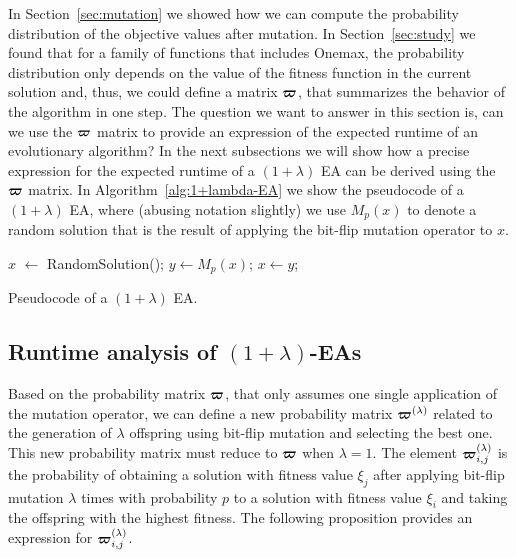 \documentclass{article}
\def\vec#1{\mathchoice{\mbox{\boldmath$\displaystyle#1$}}
  {\mbox{\boldmath$\textstyle#1$}}
  {\mbox{\boldmath$\scriptstyle#1$}}
  {\mbox{\boldmath$\scriptscriptstyle#1$}}}
\begin{document}
In Section~\ref{sec:mutation} we showed how we can compute the probability distribution of the objective values after mutation. In Section~\ref{sec:study} we found that for a family of functions that includes Onemax, the probability distribution only depends on the value of the fitness function in the current solution and, thus, we could define a matrix $\vec{\varpi}$, that summarizes the behavior of the algorithm in one step. The question we want to answer in this section is, can we use the $\vec{\varpi}$ matrix to provide an expression of the expected runtime of an evolutionary algorithm? In the next subsections we will show how a precise expression for the expected runtime of a $(1+\lambda)$ EA can be derived using the $\vec{\varpi}$ matrix. In Algorithm~\ref{alg:1+lambda-EA} we show the pseudocode of a $(1+\lambda)$ EA, where (abusing notation slightly) we use $M_p(x)$ to denote a random solution that is the result of applying the bit-flip mutation operator to $x$.

\begin{algorithm}[!ht]
\begin{algorithmic}
\STATE $x$ $\leftarrow$ RandomSolution();
\STATE $y \leftarrow M_p(x)$;
\STATE $x \leftarrow y$;
\ENDIF 
\ENDFOR
\ENDWHILE
\end{algorithmic}
\caption{Pseudocode of a $(1+\lambda)$ EA.}
\label{alg:1+lambda-EA}
\end{algorithm}



\subsection{Runtime analysis of $(1+\lambda)$-EAs}


Based on the probability matrix $\vec{\varpi}$, that only assumes one single application of the mutation operator, we can define a new probability matrix $\vec{\varpi}^{(\lambda)}$ related to the generation of $\lambda$ offspring using bit-flip mutation and selecting the best one. This new probability matrix must reduce to $\vec{\varpi}$ when $\lambda=1$. The element $\vec{\varpi}^{(\lambda)}_{i,j}$ is the probability of obtaining a solution with fitness value $\xi_j$ after applying bit-flip mutation $\lambda$ times with probability $p$ to a solution with fitness value $\xi_i$ and taking the offspring with the highest fitness. The following proposition provides an expression for $\vec{\varpi}^{(\lambda)}_{i,j}$.
\end{document}
